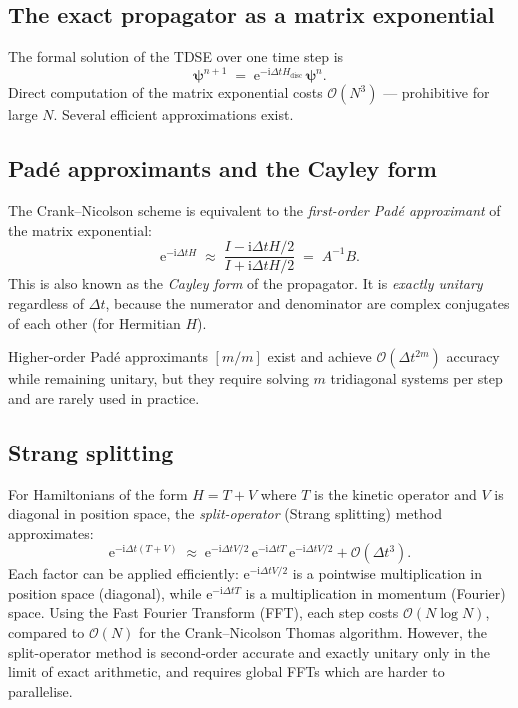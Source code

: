 \documentclass[12pt, a4paper]{article}
\newcommand{\dt}{\Delta t}
\newcommand{\ii}{\mathrm{i}}          %
\newcommand{\ee}{\mathrm{e}}          %
\newcommand{\CN}{Crank--Nicolson}
\begin{document}
\subsection{The exact propagator as a matrix exponential}

The formal solution of the TDSE over one time step is
\begin{equation}
  \boldsymbol{\psi}^{n+1} \;=\;
  \ee^{-\ii\dt H_\text{disc}}\,\boldsymbol{\psi}^n.
\end{equation}
Direct computation of the matrix exponential costs $\mathcal{O}(N^3)$
— prohibitive for large $N$.  Several efficient approximations exist.

\subsection{Padé approximants and the Cayley form}

The \CN{} scheme is equivalent to the \emph{first-order Padé
approximant} of the matrix exponential:
\begin{equation}
  \ee^{-\ii\dt H} \;\approx\;
  \frac{I - \ii\dt H/2}{I + \ii\dt H/2}
  \;=\; A^{-1}B.
  \label{eq:cayley}
\end{equation}
This is also known as the \emph{Cayley form} of the propagator.  It is
\emph{exactly unitary} regardless of $\dt$, because the numerator and
denominator are complex conjugates of each other (for Hermitian $H$).

Higher-order Padé approximants $[m/m]$ exist and achieve
$\mathcal{O}(\dt^{2m})$ accuracy while remaining unitary, but they
require solving $m$ tridiagonal systems per step and are rarely used
in practice.

\subsection{Strang splitting}

For Hamiltonians of the form $H = T + V$ where $T$ is the kinetic
operator and $V$ is diagonal in position space, the
\emph{split-operator} (Strang splitting) method approximates:
\begin{equation}
  \ee^{-\ii\dt(T+V)} \;\approx\;
  \ee^{-\ii\dt V/2}\,\ee^{-\ii\dt T}\,\ee^{-\ii\dt V/2}
  + \mathcal{O}(\dt^3).
\end{equation}
Each factor can be applied efficiently: $\ee^{-\ii\dt V/2}$ is a
pointwise multiplication in position space (diagonal), while
$\ee^{-\ii\dt T}$ is a multiplication in momentum (Fourier) space.
Using the Fast Fourier Transform (FFT), each step costs
$\mathcal{O}(N\log N)$, compared to $\mathcal{O}(N)$ for the \CN{}
Thomas algorithm.  However, the split-operator method is second-order
accurate and exactly unitary only in the limit of exact arithmetic, and
requires global FFTs which are harder to parallelise.
\end{document}
